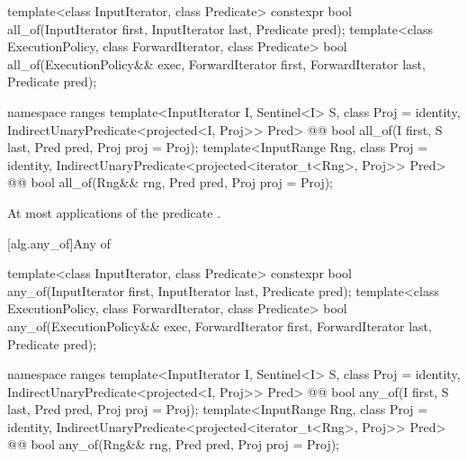 %
\begin{itemdecl}
template<class InputIterator, class Predicate>
  constexpr bool all_of(InputIterator first, InputIterator last, Predicate pred);
template<class ExecutionPolicy, class ForwardIterator, class Predicate>
  bool all_of(ExecutionPolicy&& exec, ForwardIterator first, ForwardIterator last,
              Predicate pred);
\end{itemdecl}\begin{addedblock}\begin{itemdecl}
namespace ranges {
  template<InputIterator I, Sentinel<I> S, class Proj = identity,
      IndirectUnaryPredicate<projected<I, Proj>> Pred>
    @@ bool all_of(I first, S last, Pred pred, Proj proj = Proj{});
  template<InputRange Rng, class Proj = identity,
      IndirectUnaryPredicate<projected<iterator_t<Rng>, Proj>> Pred>
    @@ bool all_of(Rng&& rng, Pred pred, Proj proj = Proj{});
}
\end{itemdecl}\end{addedblock}

\begin{itemdescr}
\pnum
{}

\pnum
{}


\pnum
\complexity At most  applications of the predicate
.
\end{itemdescr}

[alg.any_of]{Any of}

%
\begin{itemdecl}
template<class InputIterator, class Predicate>
  constexpr bool any_of(InputIterator first, InputIterator last, Predicate pred);
template<class ExecutionPolicy, class ForwardIterator, class Predicate>
  bool any_of(ExecutionPolicy&& exec, ForwardIterator first, ForwardIterator last,
              Predicate pred);
\end{itemdecl}\begin{addedblock}\begin{itemdecl}
namespace ranges {
  template<InputIterator I, Sentinel<I> S, class Proj = identity,
      IndirectUnaryPredicate<projected<I, Proj>> Pred>
    @@ bool any_of(I first, S last, Pred pred, Proj proj = Proj{});
  template<InputRange Rng, class Proj = identity,
      IndirectUnaryPredicate<projected<iterator_t<Rng>, Proj>> Pred>
    @@ bool any_of(Rng&& rng, Pred pred, Proj proj = Proj{});
}
\end{itemdecl}\end{addedblock}

